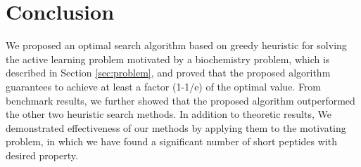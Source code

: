 \documentclass[opre,nonblindrev]{informs3} %
\begin{document}
\section{Conclusion}
We proposed an optimal search algorithm based on greedy heuristic for solving the active learning problem motivated by a biochemistry problem, which is described in Section \ref{sec:problem}, and proved that the proposed algorithm guarantees to achieve at least a factor (1-1/e) of the optimal value. From benchmark results, we further showed that the proposed algorithm outperformed the other two heuristic search methods. In addition to theoretic results, We demonstrated
effectiveness of our methods by applying them to the motivating problem, in which we have found a significant number of short peptides with desired property.
%
%
%










\end{document}
